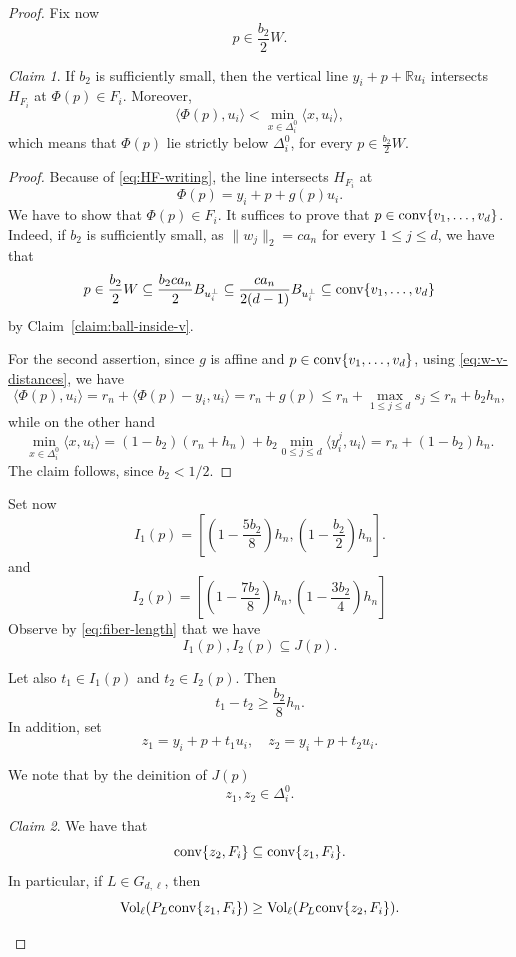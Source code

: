 \documentclass[10pt]{amsart}
\newcommand{\1}{\textbf{1}}
\newcommand{\conv}{{\rm conv}}
\newcommand{\vol}{{\rm Vol}}
\numberwithin{equation}{section} %
\theoremstyle{remark}
\newtheorem{claim}{Claim}
\theoremstyle{definition}
\begin{document}
\begin{proof}
     Fix now \[p \in \frac{b_2}{2}W.\]

     \begin{claim}\label{claim:p-line-intersection}
         If $b_2$ is sufficiently small, then the vertical line $y_i+p+\mathbb{R}u_i$ intersects $H_{F_i}$ at $\Phi(p) \in F_i$. Moreover, \[\langle \Phi(p), u_i \rangle < \min_{x \in \Delta_i^0} \langle x, u_i\rangle, \] which means that $\Phi(p)$ lie strictly below $\Delta_i^0$, for every $ p \in \frac{b_2}{2}W$.
     \end{claim}

     \begin{proof}
     Because of \eqref{eq:HF-writing}, the line intersects $H_{F_i}$ at \[\Phi(p)=y_i+p+g(p)u_i.\] We have to show that $\Phi(p) \in F_i$. It suffices to prove that $p \in \conv\{v_1,\ldots,v_d\}$. Indeed, if $b_2$ is sufficiently small, as $\|w_j\|_2=ca_n$ for every $1 \leq j \leq d$, we have that \[p \in \frac{b_2}{2}W  \subseteq \frac{b_2ca_n}{2}B_{u_i^\perp} \subseteq \frac{ca_n}{2(d-1)}B_{u_i^\perp} \subseteq \conv\{v_1,\ldots,v_d\}\] by Claim~\ref{claim:ball-inside-v}.

     For the second assertion, since $g$ is affine and $p \in \conv\{v_1,\ldots,v_d\}$, using \eqref{eq:w-v-distances}, we have \[\langle \Phi(p),u_i \rangle=r_n+ \langle \Phi(p)-y_i,u_i \rangle =r_n+g(p) \leq r_n+ \max_{1 \leq j \leq d} s_j \leq r_n+ b_2h_n,\] while on the other hand
     \[\min_{x \in \Delta_i^0} \langle x, u_i \rangle =(1-b_2)(r_n+h_n)+b_2\min_{0 \leq j \leq d} \langle y_i^j,u_i\rangle=r_n+(1-b_2)h_n.\] The claim follows, since $b_2<1/2$.        
     \end{proof}

     Set now \[I_1(p)= \left[ \left(1-\frac{5b_2}{8}\right)h_n, \left(1-\frac{b_2}{2}\right)h_n \right].\]
     and
     \[I_2(p)= \left[ \left(1-\frac{7b_2}{8}\right)h_n , \left(1-\frac{3b_2}{4}\right)h_n \right]\] 
       Observe by \eqref{eq:fiber-length} that we have  \[I_1(p),I_2(p) \subseteq J(p).\]

     Let also $t_1 \in I_1(p)$ and $t_2 \in I_2(p).$ Then \begin{equation}\label{eq:tj-difference}
      t_1-t_2 \geq \frac{b_2}{8}h_n.  
     \end{equation}
     In addition, set \[z_1=y_i+p+t_1u_i, \quad z_2=y_i+p+t_2u_i.\]

    We note that by the deinition of $J(p)$ \[z_1,z_2 \in \Delta_i^0.\]

     \begin{claim}\label{claim:convex-hull-inclusion}
         We have that \[\conv\{z_2,F_i\}\subseteq \conv\{z_1,F_i\}.\] In particular, if  $L \in G_{d,\ell}$, then \[\vol_{\ell}(P_L \conv\{z_1,F_i\}) \geq \vol_{\ell}(P_L \conv\{z_2,F_i\}).\]
     \end{claim}


\end{proof}
\end{document}
